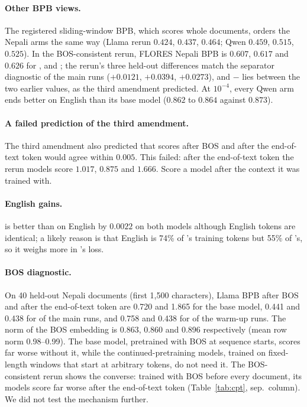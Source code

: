 \paragraph{Other BPB views.} The registered sliding-window BPB, which scores whole documents, orders the Nepali arms the same way (Llama rerun $0.424$, $0.437$, $0.464$; Qwen $0.459$, $0.515$, $0.525$). In the BOS-consistent rerun, FLORES Nepali BPB is $0.607$, $0.617$ and $0.626$ for \RO{}, \RI{} and \RII{}; the rerun's three held-out differences match the separator diagnostic of the main runs ($+0.0121$, $+0.0394$, $+0.0273$), and \RII{} $-$ \RI{} lies between the two earlier values, as the third amendment predicted. At $10^{-4}$, every Qwen arm ends better on English than its base model ($0.862$ to $0.864$ against $0.873$).

\paragraph{A failed prediction of the third amendment.} The third amendment also predicted that scores after BOS and after the end-of-text token would agree within $0.005$. This failed: after the end-of-text token the rerun models score $1.017$, $0.875$ and $1.666$. Score a model after the context it was trained with.

\paragraph{English gains.} \RII{} is better than \RI{} on English by $0.0022$ on both models although English tokens are identical; a likely reason is that English is 74\% of \RII{}'s training tokens but 55\% of \RI{}'s, so it weighs more in \RII{}'s loss.

\paragraph{BOS diagnostic.} On 40 held-out Nepali documents (first 1{,}500 characters), Llama BPB after BOS and after the end-of-text token are 0.720 and 1.865 for the base model, 0.441 and 0.438 for \RO{} of the main runs, and 0.758 and 0.438 for \RO{} of the warm-up runs. The norm of the BOS embedding is 0.863, 0.860 and 0.896 respectively (mean row norm 0.98--0.99). The base model, pretrained with BOS at sequence starts, scores far worse without it, while the continued-pretraining models, trained on fixed-length windows that start at arbitrary tokens, do not need it. The BOS-consistent rerun shows the converse: trained with BOS before every document, its models score far worse after the end-of-text token (Table~\ref{tab:cpt}, sep.\ column). We did not test the mechanism further.

